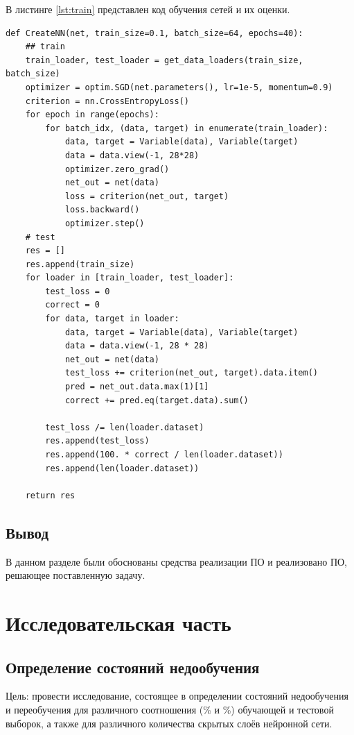 \documentclass[12pt]{report}
\begin{document}
В листинге \ref{lst:train} представлен код обучения сетей и их оценки.

\begin{lstlisting}[label=lst:train,caption=Обучение сетей и их оценка]
def CreateNN(net, train_size=0.1, batch_size=64, epochs=40):
    ## train
    train_loader, test_loader = get_data_loaders(train_size, batch_size)
    optimizer = optim.SGD(net.parameters(), lr=1e-5, momentum=0.9)
    criterion = nn.CrossEntropyLoss()
    for epoch in range(epochs):
        for batch_idx, (data, target) in enumerate(train_loader):
            data, target = Variable(data), Variable(target)
            data = data.view(-1, 28*28)
            optimizer.zero_grad()
            net_out = net(data)
            loss = criterion(net_out, target)
            loss.backward()
            optimizer.step()
    # test
    res = []
    res.append(train_size)
    for loader in [train_loader, test_loader]:
        test_loss = 0
        correct = 0
        for data, target in loader:
            data, target = Variable(data), Variable(target)
            data = data.view(-1, 28 * 28)
            net_out = net(data)
            test_loss += criterion(net_out, target).data.item()
            pred = net_out.data.max(1)[1] 
            correct += pred.eq(target.data).sum()

        test_loss /= len(loader.dataset)
        res.append(test_loss)
        res.append(100. * correct / len(loader.dataset))
        res.append(len(loader.dataset))
    
    return res

\end{lstlisting}

\section*{Вывод}
В данном разделе были обоснованы средства реализации ПО и реализовано ПО, решающее поставленную задачу.

\chapter{Исследовательская часть}

\section{Определение состояний недообучения}

Цель: провести исследование, состоящее в определении состояний недообучения и переобучения для различного соотношения (\% и \%) обучающей и тестовой выборок, а также для различного количества скрытых слоёв нейронной сети.
\end{document}
